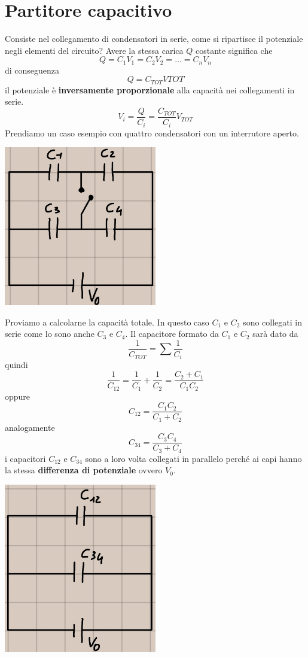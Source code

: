 \documentclass[a4paper, 12pt]{book}
\theoremstyle{plain}
\begin{document}
\section{Partitore capacitivo}

Consiste nel collegamento di condensatori in serie, 
come si ripartisce il potenziale negli elementi del circuito?
Avere la stessa carica $Q$ costante significa che \[ Q = 
C_1 V_1 = C_2 V_2 = \dots = C_n V_n \] di conseguenza
\[ Q = C_{TOT} V{TOT} \] il potenziale è \textbf{inversamente 
proporzionale} alla capacità nei collegamenti in serie.
\[ V_i = \frac{Q}{C_i} = \frac{C_{TOT}}{C_i} V_{TOT} \]
Prendiamo un caso esempio con quattro condensatori con 
un interrutore aperto.
\begin{center}
    \includegraphics[width=0.5\textwidth]{int_aperto.jpg}
\end{center}
Proviamo a calcolarne la capacità totale. In questo caso
$C_1$ e $C_2$ sono collegati in serie come lo sono anche 
$C_3$ e $C_4$. Il capacitore formato da $C_1$ e $C_2$ sarà 
dato da \[ \frac{1}{C_{TOT}} = \sum \frac{1}{C_i} \] 
quindi \[ \frac{1}{C_{12}} = \frac{1}{C_1} + \frac{1}{C_2} = \frac{C_2 + C_1}{C_1C_2}\] 
oppure \[ C_{12} = \frac{C_1C_2}{C_1+C_2}\]  analogamente 
\[ C_{34} = \frac{C_3C_4}{C_3+C_4}\] i capacitori 
$C_{12}$ e $C_{34}$ sono a loro volta collegati in parallelo 
perché ai capi hanno la stessa \textbf{differenza di potenziale} ovvero $V_0$.
\begin{center}
    \includegraphics[width=0.5\textwidth]{coll_parall_2.jpg}
\end{center}
\end{document}

